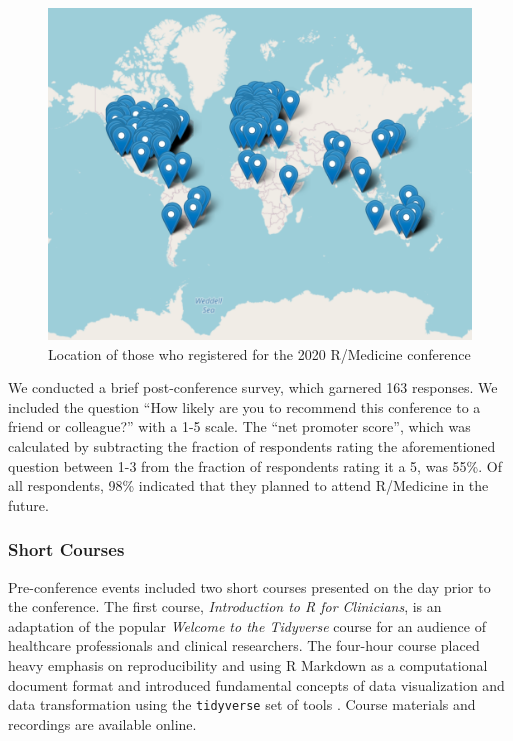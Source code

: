 \begin{Schunk}
\begin{figure}

{\centering \includegraphics[width=0.7\linewidth]{Figure} 

}

\caption[Location of those who registered for the 2020 R/Medicine conference]{Location of those who registered for the 2020 R/Medicine conference}\label{fig:map}
\end{figure}
\end{Schunk}

We conducted a brief post-conference survey, which garnered 163
responses. We included the question ``How likely are you to recommend
this conference to a friend or colleague?'' with a 1-5 scale. The ``net
promoter score'', which was calculated by subtracting the fraction of
respondents rating the aforementioned question between 1-3 from the
fraction of respondents rating it a 5, was 55\%. Of all respondents,
98\% indicated that they planned to attend R/Medicine in the future.

\hypertarget{short-courses}{%
\subsubsection{Short Courses}\label{short-courses}}

Pre-conference events included two short courses presented on the day
prior to the conference. The first course, \emph{Introduction to R for
Clinicians}, is an adaptation of the popular \emph{Welcome to the
Tidyverse} course \citep{tidyclass} for an audience of healthcare
professionals and clinical researchers. The four-hour course placed
heavy emphasis on reproducibility and using R Markdown as a
computational document format and introduced fundamental concepts of
data visualization and data transformation using the \texttt{tidyverse}
set of tools \citep{Wickham2019}. Course materials \citep{introcourse}
and recordings \citep{introhear} are available online.

